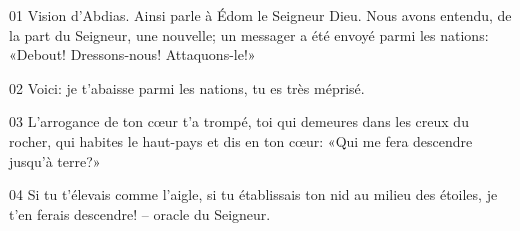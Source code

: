 01 Vision d’Abdias. Ainsi parle à Édom le Seigneur Dieu. Nous avons entendu, de la part du Seigneur, une nouvelle; un messager a été envoyé parmi les nations: «Debout! Dressons-nous! Attaquons-le!»

02 Voici: je t’abaisse parmi les nations, tu es très méprisé.

03 L’arrogance de ton cœur t’a trompé, toi qui demeures dans les creux du rocher, qui habites le haut-pays et dis en ton cœur: «Qui me fera descendre jusqu’à terre?»

04 Si tu t’élevais comme l’aigle, si tu établissais ton nid au milieu des étoiles, je t’en ferais descendre! – oracle du Seigneur.
